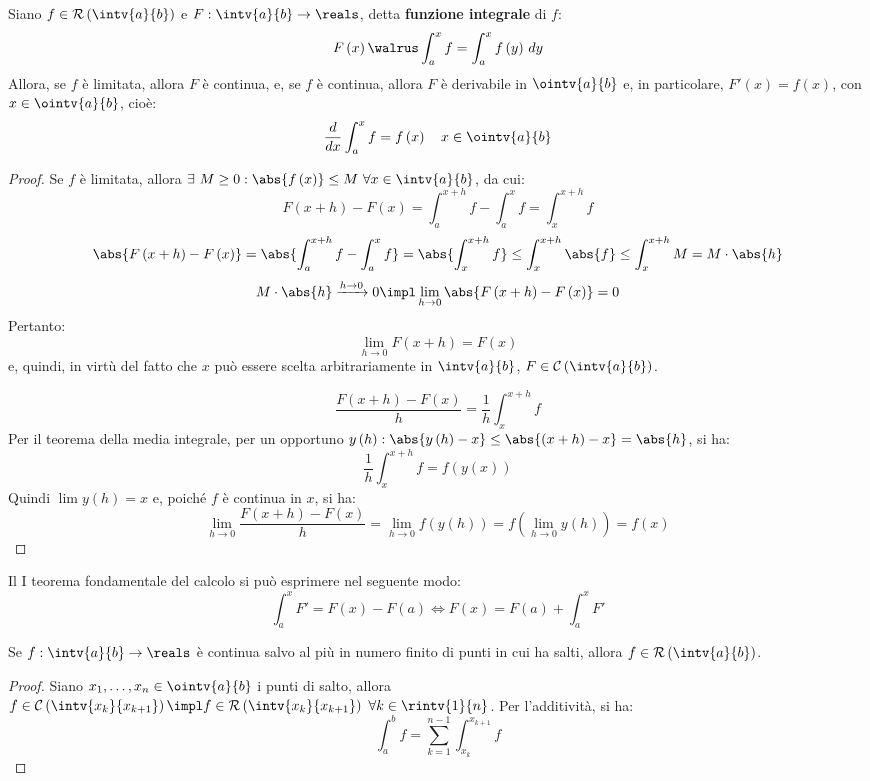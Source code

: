 \begin{theorem}
  Siano $f\in\mathcal{R}\left( \intv{a}{b} \right)$ e $F:\intv{a}{b}\to\reals$, detta \textbf{funzione integrale} di $f$:
  $$F\left( x \right)\walrus\int_a^xf=\int_a^xf\left( y \right)\,dy$$
  Allora, se $f$ è limitata, allora $F$ è continua, e, se $f$ è continua, allora $F$ è derivabile in $\ointv{a}{b}$ e, in particolare, $F'\left( x \right)=f\left( x \right)$, con $x\in\ointv{a}{b}$, cioè:
  $$\frac{d}{dx}\int_a^xf=f\left( x \right)\quad x\in\ointv{a}{b}$$
\end{theorem}
\begin{proof}
  Se $f$ è limitata, allora $\exists\ M\ge0:\abs{f\left( x \right)}\le M\ \forall x\in\intv{a}{b}$, da cui:
  $$F\left( x+h \right)-F\left( x \right)=\int_a^{x+h}f-\int_a^xf=\int_x^{x+h}f$$
  $$\abs{F\left( x+h \right)-F\left( x \right)}=\abs{\int_a^{x+h}f-\int_a^xf}=\abs{\int_x^{x+h}f}\le \int_x^{x+h}\abs{f}\le\int_x^{x+h}M=M\cdot\abs{h}$$
  $$M\cdot\abs{h}\xrightarrow{h\to0} 0\impl \lim_{h\to0}\abs{F\left( x+h \right)-F\left( x \right)}=0$$
  Pertanto:
  $$\lim_{h\to0}F\left( x+h\right)=F\left( x \right)$$
  e, quindi, in virtù del fatto che $x$ può essere scelta arbitrariamente in $\intv{a}{b}$, $F\in\mathcal{C}\left( \intv{a}{b} \right)$.
  
  $$\frac{F\left( x+h \right)-F\left( x \right)}{h}=\frac{1}{h}\int_x^{x+h}f$$
  Per il teorema della media integrale, per un opportuno $y\left( h \right):\abs{y\left( h \right)-x}\le\abs{\left( x+h \right)-x}=\abs{h}$, si ha:
  $$\frac{1}{h}\int_x^{x+h}f=f\left( y\left( x \right) \right)$$
  Quindi $\lim y\left( h \right)=x$ e, poiché $f$ è continua in $x$, si ha:
  $$\lim_{h\to0}\frac{F\left( x+h \right)-F\left( x \right)}{h}=\lim_{h\to0}f\left( y\left( h \right) \right)=f\left( \lim_{h\to0}y\left( h \right) \right)=f\left( x \right)$$
\end{proof}
\begin{observation}
  Il I teorema fondamentale del calcolo si può esprimere nel seguente modo:
  $$\int_a^xF'=F\left( x \right)-F\left( a \right)\iff F\left( x \right)=F\left( a \right)+\int_a^xF'$$
\end{observation}

\begin{lemma}
  Se $f:\intv{a}{b}\to\reals$ è continua salvo al più in numero finito di punti in cui ha salti, allora $f\in\mathcal{R}\left( \intv{a}{b} \right)$.
\end{lemma}
\begin{proof}
  Siano $x_1,\dots,x_n\in\ointv{a}{b}$ i punti  di salto, allora $f\in\mathcal{C}\left( \intv{x_k}{x_{k+1}} \right)\impl f\in\mathcal{R}\left( \intv{x_k}{x_{k+1}} \right)\ \forall k\in\rintv{1}{n}$. Per l'additività, si ha:
  $$\int_a^bf=\sum_{k=1}^{n-1}\int_{x_k}^{x_{k+1}}f$$
\end{proof}

